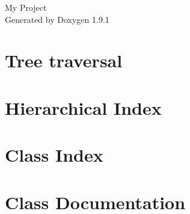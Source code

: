 \let\mypdfximage\pdfximage\def\pdfximage{\immediate\mypdfximage}\documentclass[twoside]{book}
\newcommand{\+}{\discretionary{\mbox{\scriptsize$\hookleftarrow$}}{}{}}
\newcommand{\clearemptydoublepage}{%
  \newpage{\pagestyle{empty}\cleardoublepage}%
}
\begin{document}
\raggedbottom

\hypersetup{pageanchor=false,
             bookmarksnumbered=true,
             pdfencoding=unicode
            }
\begin{titlepage}
\vspace*{7cm}
\begin{center}%
{\Large My Project }\\
\vspace*{1cm}
{\large Generated by Doxygen 1.9.1}\\
\end{center}
\end{titlepage}
\clearemptydoublepage
{}
\tableofcontents
\clearemptydoublepage
{}
\hypersetup{pageanchor=true}

\chapter{Tree traversal}
\label{md_README}

\chapter{Hierarchical Index}

\chapter{Class Index}

\chapter{Class Documentation}




\backmatter
\newpage
{}
\clearemptydoublepage
{}
\printindex
\end{document}
